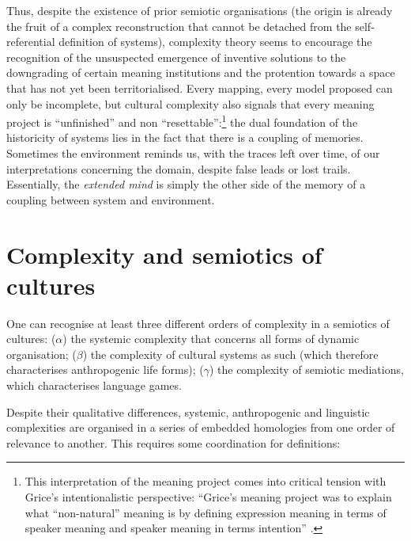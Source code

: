 \documentclass[output=paper]{langscibook}
\begin{document}
Thus, despite the existence of prior semiotic organisations (the origin is already the fruit of a complex reconstruction that cannot be detached from the self-referential definition of systems), complexity theory seems to encourage the recognition of the unsuspected emergence of inventive solutions to the downgrading of certain meaning institutions and the protention towards a space that has not yet been territorialised. Every mapping, every model proposed can only be incomplete, but cultural complexity also signals that every meaning project is “unfinished” and non “resettable”:\footnote{This interpretation of the meaning project comes into critical tension with Grice's intentionalistic perspective: “Grice's meaning project was to explain what ``non-natural'' meaning is by defining expression meaning in terms of speaker meaning and speaker meaning in terms intention” \citep[41]{Davis2007}.} the dual foundation of the historicity of systems lies in the fact that there is a coupling of memories. Sometimes the environment reminds us, with the traces left over time, of our interpretations concerning the domain, despite false leads or lost trails. Essentially, the \textit{extended mind} is simply the other side of the memory of a coupling between system and environment.

\section{Complexity and semiotics of cultures} %

One can recognise at least three different orders of complexity in a semiotics of cultures: (${\alpha}$) the systemic complexity that concerns all forms of dynamic organisation; (${\beta}$) the complexity of cultural systems as such (which therefore characterises anthropogenic life forms); (${\gamma}$) the complexity of semiotic mediations, which characterises language games.

Despite their qualitative differences, systemic, anthropogenic and linguistic complexities are organised in a series of embedded homologies from one order of relevance to another. This requires some coordination for definitions: 
\end{document}
